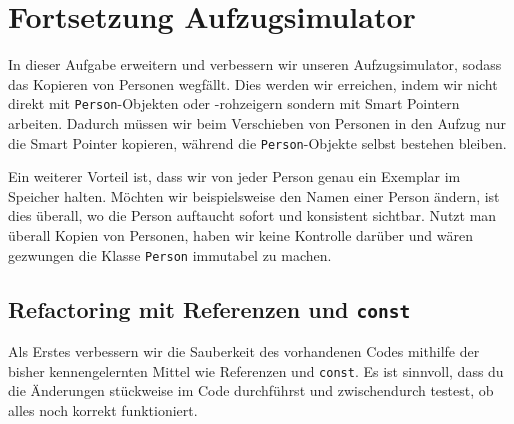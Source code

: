 \section{Fortsetzung Aufzugsimulator}
In dieser Aufgabe erweitern und verbessern wir unseren Aufzugsimulator, sodass das Kopieren von Personen wegfällt.
Dies werden wir erreichen, indem wir nicht direkt mit \lstinline{Person}-Objekten oder -rohzeigern sondern mit Smart Pointern arbeiten.
Dadurch müssen wir beim Verschieben von Personen in den Aufzug nur die Smart Pointer kopieren, während die \lstinline{Person}-Objekte selbst bestehen bleiben.

Ein weiterer Vorteil ist, dass wir von jeder Person genau ein Exemplar im Speicher halten.
Möchten wir beispielsweise den Namen einer Person ändern, ist dies überall, wo die Person auftaucht sofort und konsistent sichtbar.
Nutzt man überall Kopien von Personen, haben wir keine Kontrolle darüber und wären gezwungen die Klasse \lstinline{Person} immutabel zu machen. \\


\subsection{Refactoring mit Referenzen und \lstinline{const}}
Als Erstes verbessern wir die Sauberkeit des vorhandenen Codes mithilfe der bisher kennengelernten Mittel wie Referenzen und \lstinline{const}.
Es ist sinnvoll, dass du die Änderungen stückweise im Code durchführst und zwischendurch testest, ob alles noch korrekt funktioniert.

